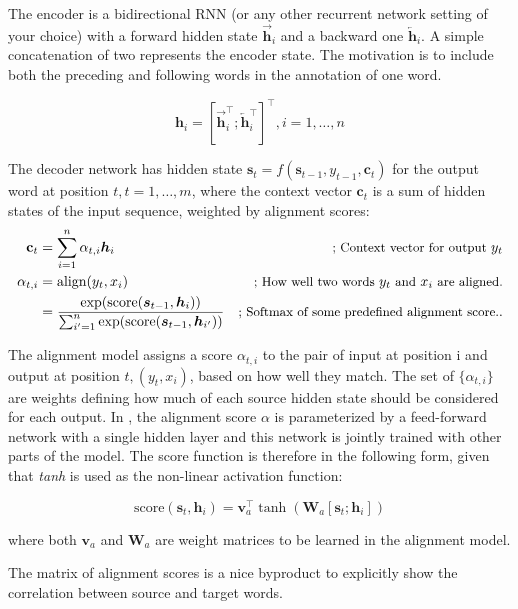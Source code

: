 The encoder is a bidirectional RNN (or any other recurrent network setting of your choice) with a forward hidden state $\overrightarrow{\boldsymbol{h}}_i$ and a backward one $\overleftarrow{\boldsymbol{h}}_i$. A simple concatenation of two represents the encoder state. The motivation is to include both the preceding and following words in the annotation of one word.

$$
\boldsymbol{h}_i = [\overrightarrow{\boldsymbol{h}}_i^\top; \overleftarrow{\boldsymbol{h}}_i^\top]^\top, i=1,\dots,n
$$

The decoder network has hidden state $\boldsymbol{s}_t=f(\boldsymbol{s}_{t-1}, y_{t-1}, \mathbf{c}_t)$ for the output word at position $t, t=1,\dots,m$, where the context vector $\mathbf{c}_t$ is a sum of hidden states of the input sequence, weighted by alignment scores:
$$
\begin{aligned}
\mathbf{c}_t &= \sum_{i=1}^n \alpha_{t,i} \boldsymbol{h}_i & \small{\text{; Context vector for output }y_t}\\
\alpha_{t,i} &= \text{align}(y_t, x_i) & \small{\text{; How well two words }y_t\text{ and }x_i\text{ are aligned.}}\\
&= \frac{\exp(\text{score}(\boldsymbol{s}_{t-1}, \boldsymbol{h}_i))}{\sum_{i'=1}^n \exp(\text{score}(\boldsymbol{s}_{t-1}, \boldsymbol{h}_{i'}))} & \small{\text{; Softmax of some predefined alignment score.}}.
\end{aligned}
$$

The alignment model assigns a score $\alpha_{t,i}$ to the pair of input at position i and output at position $t, (y_t, x_i)$, based on how well they match. The set of $\{\alpha_{t, i}\}$ are weights defining how much of each source hidden state should be considered for each output. In \citep{Bahdanau2015}, the alignment score $\alpha$ is parameterized by a feed-forward network with a single hidden layer and this network is jointly trained with other parts of the model. The score function is therefore in the following form, given that \textit{tanh} is used as the non-linear activation function:

$$\text{score}(\boldsymbol{s}_t, \boldsymbol{h}_i) = \mathbf{v}_a^\top \tanh(\mathbf{W}_a[\boldsymbol{s}_t; \boldsymbol{h}_i])$$

where both $\mathbf{v}_a$ and $\mathbf{W}_a$ are weight matrices to be learned in the alignment model.

The matrix of alignment scores is a nice byproduct to explicitly show the correlation between source and target words.

